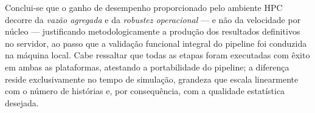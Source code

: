 Conclui-se que o ganho de desempenho proporcionado pelo ambiente HPC decorre da
\emph{vazão agregada} e da \emph{robustez operacional} --- e não da velocidade
por núcleo --- justificando metodologicamente a produção dos resultados
definitivos no servidor, ao passo que a validação funcional integral do pipeline
foi conduzida na máquina local. Cabe ressaltar que todas as etapas foram
executadas com êxito em ambas as plataformas, atestando a portabilidade do
pipeline; a diferença reside exclusivamente no tempo de simulação, grandeza que
escala linearmente com o número de histórias e, por consequência, com a
qualidade estatística desejada.

